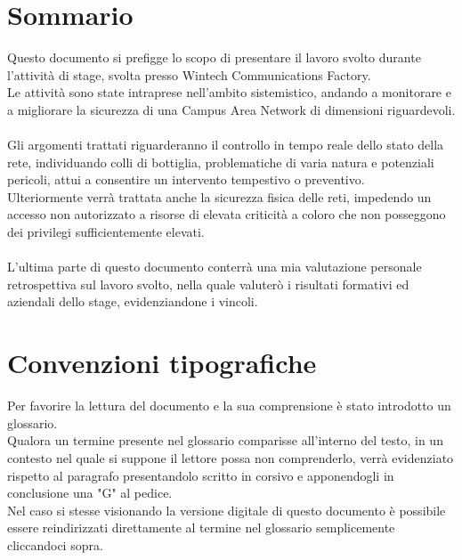 \documentclass[Tesi.tex]{subfiles}
\begin{document}
\clearpage\thispagestyle{empty}
	
\renewcommand{\chaptername}{}
\renewcommand{\thechapter}{}
\chapter{Sommario}
Questo documento si prefigge lo scopo di presentare il lavoro svolto durante l'attività di stage, svolta presso Wintech Communications Factory. \\
Le attività sono state intraprese nell'ambito sistemistico, andando a monitorare e a migliorare la sicurezza di una Campus Area Network di dimensioni riguardevoli. \\\\

Gli argomenti trattati riguarderanno il controllo in tempo reale dello stato della rete, individuando colli di bottiglia, problematiche di varia natura e potenziali pericoli, attui a consentire un intervento tempestivo o preventivo.\\
Ulteriormente verrà trattata anche la sicurezza fisica delle reti, impedendo un accesso non autorizzato a risorse di elevata criticità a coloro che non posseggono dei privilegi sufficientemente elevati. \\\\

L'ultima parte di questo documento conterrà una mia valutazione personale retrospettiva sul lavoro svolto, nella quale valuterò i risultati formativi ed aziendali dello stage, evidenziandone i vincoli. \\

\newpage
\chapter{Convenzioni tipografiche}
Per favorire la lettura del documento e la sua comprensione è stato introdotto un glossario. \\
Qualora un termine presente nel glossario comparisse all'interno del testo, in un contesto nel quale si suppone il lettore possa non comprenderlo, verrà evidenziato rispetto al paragrafo presentandolo scritto in corsivo e apponendogli in conclusione una "G" al pedice. \\
Nel caso si stesse visionando la versione digitale di questo documento è possibile essere reindirizzati direttamente al termine nel glossario semplicemente cliccandoci sopra. \\


\clearpage
\end{document}
